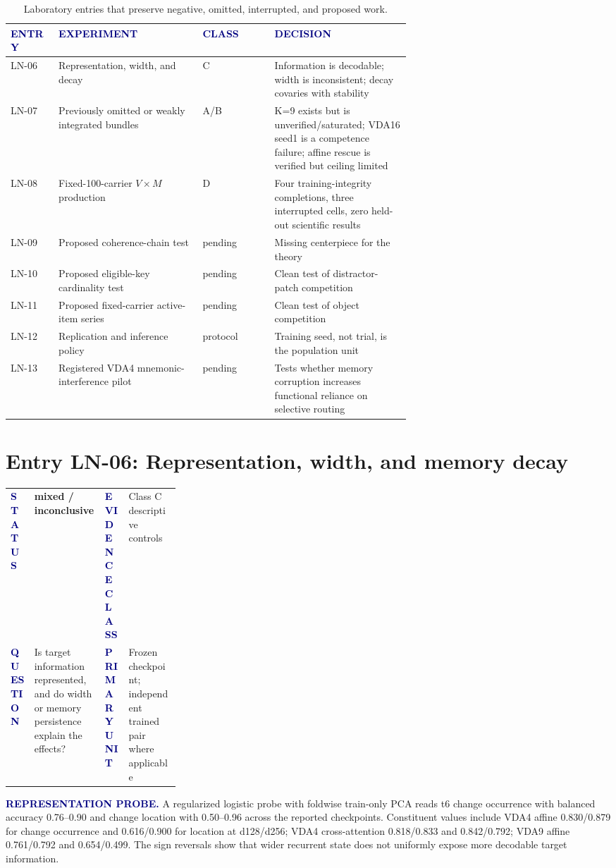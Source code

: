 \documentclass[11pt]{article}
\makeatletter
\renewcommand{\arraystretch}{1.16}
\newcommand{\statusmixed}{\colorbox{PaleAmber}{\textcolor{Amber}{\sffamily\bfseries mixed / inconclusive}}}
\newcommand{\smallcapslabel}[1]{\textcolor{Navy}{\sffamily\bfseries\footnotesize\MakeUppercase{#1}}}
\newcommand{\entrymeta}[4]{%
  \noindent\begin{tabularx}{\linewidth}{@{}L{0.14\linewidth}Y L{0.14\linewidth}Y@{}}
  \toprule
  \smallcapslabel{Status} & #1 & \smallcapslabel{Evidence class} & #2\\
  \smallcapslabel{Question} & #3 & \smallcapslabel{Primary unit} & #4\\
  \bottomrule
  \end{tabularx}
}
\makeatother
\begin{document}
\begin{table}[H]
\centering\footnotesize
\renewcommand{\arraystretch}{1.02}
\begin{tabularx}{\linewidth}{@{}L{0.12\linewidth}L{0.36\linewidth}L{0.18\linewidth}Y@{}}
\toprule
\smallcapslabel{Entry} & \smallcapslabel{Experiment} & \smallcapslabel{Class} & \smallcapslabel{Decision}\\
\midrule
LN-06 & Representation, width, and decay & C & Information is decodable; width is inconsistent; decay covaries with stability\\
LN-07 & Previously omitted or weakly integrated bundles & A/B & K=9 exists but is unverified/saturated; VDA16 seed1 is a competence failure; affine rescue is verified but ceiling limited\\
LN-08 & Fixed-100-carrier $V\times M$ production & D & Four training-integrity completions, three interrupted cells, zero held-out scientific results\\
LN-09 & Proposed coherence-chain test & pending & Missing centerpiece for the theory\\
LN-10 & Proposed eligible-key cardinality test & pending & Clean test of distractor-patch competition\\
LN-11 & Proposed fixed-carrier active-item series & pending & Clean test of object competition\\
LN-12 & Replication and inference policy & protocol & Training seed, not trial, is the population unit\\
LN-13 & Registered VDA4 mnemonic-interference pilot & pending & Tests whether memory corruption increases functional reliance on selective routing\\
\bottomrule
\end{tabularx}
\caption{Laboratory entries that preserve negative, omitted, interrupted, and proposed work.}
\end{table}

\section{Entry LN-06: Representation, width, and memory decay}
\entrymeta{\statusmixed}{Class C descriptive controls}{Is target information represented, and do width or memory persistence explain the effects?}{Frozen checkpoint; independent trained pair where applicable}

\smallcapslabel{Representation probe.}
A regularized logistic probe with foldwise train-only PCA reads t6 change occurrence with balanced accuracy 0.76--0.90 and change location with 0.50--0.96 across the reported checkpoints. Constituent values include VDA4 affine 0.830/0.879 for change occurrence and 0.616/0.900 for location at d128/d256; VDA4 cross-attention 0.818/0.833 and 0.842/0.792; VDA9 affine 0.761/0.792 and 0.654/0.499. The sign reversals show that wider recurrent state does not uniformly expose more decodable target information.
\end{document}
